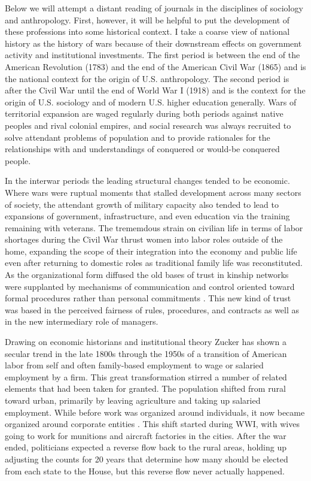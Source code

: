 \documentclass[]{book}
\theoremstyle{definition}
\theoremstyle{definition}
\theoremstyle{definition}
\theoremstyle{remark}
\begin{document}
Below we will attempt a distant reading of journals in the disciplines
of sociology and anthropology. First, however, it will be helpful to put
the development of these professions into some historical context. I
take a coarse view of national history as the history of wars because of
their downstream effects on government activity and institutional
investments. The first period is between the end of the American
Revolution (1783) and the end of the American Civil War (1865) and is
the national context for the origin of U.S. anthropology. The second
period is after the Civil War until the end of World War I (1918) and is
the context for the origin of U.S. sociology and of modern U.S. higher
education generally. Wars of territorial expansion are waged regularly
during both periods against native peoples and rival colonial empires,
and social research was always recruited to solve attendant problems of
population and to provide rationales for the relationships with and
understandings of conquered or would-be conquered people.

In the interwar periods the leading structural changes tended to be
economic. Where wars were ruptual moments that stalled development
across many sectors of society, the attendant growth of military
capacity also tended to lead to expansions of government,
infrastructure, and even education via the training remaining with
veterans. The trememdous strain on civilian life in terms of labor
shortages during the Civil War thrust women into labor roles outside of
the home, expanding the scope of their integration into the economy and
public life even after returning to domestic roles as traditional family
life was reconstituted. As the organizational form diffused the old
bases of trust in kinship networks were supplanted by mechanisms of
communication and control oriented toward formal procedures rather than
personal commitments \citep{Zucker1986Production}. This new kind of
trust was based in the perceived fairness of rules, procedures, and
contracts as well as in the new intermediary role of managers.

Drawing on economic historians and institutional theory Zucker
\citeyearpar{Zucker1983Organizations} has shown a secular trend in the
late 1800s through the 1950s of a transition of American labor from self
and often family-based employment to wage or salaried employment by a
firm. This great transformation stirred a number of related elements
that had been taken for granted. The population shifted from rural
toward urban, primarily by leaving agriculture and taking up salaried
employment. While before work was organized around individuals, it now
became organized around corporate entities \citeyearpar[Figure
3]{Zucker1983Organizations}. This shift started during WWI, with wives
going to work for munitions and aircraft factories in the cities. After
the war ended, politicians expected a reverse flow back to the rural
areas, holding up adjusting the counts for 20 years that determine how
many should be elected from each state to the House, but this reverse
flow never actually happened.
\end{document}

